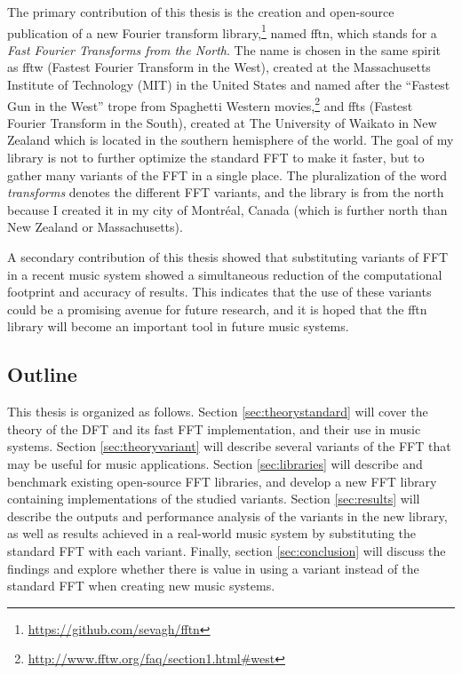 \documentclass[letter,12pt,notitlepage]{article}
\begin{document}
The primary contribution of this thesis is the creation and open-source publication of a new Fourier transform library,\footnote{\href{https://github.com/sevagh/fftn}{https://github.com/sevagh/fftn}} named fftn, which stands for a \textit{Fast Fourier Transforms from the North}. The name is chosen in the same spirit as fftw \cite{fftw} (Fastest Fourier Transform in the West), created at the Massachusetts Institute of Technology (MIT) in the United States and named after the ``Fastest Gun in the West'' trope from Spaghetti Western movies,\footnote{\href{http://www.fftw.org/faq/section1.html\#west}{http://www.fftw.org/faq/section1.html\#west}} and ffts \cite{ffts} (Fastest Fourier Transform in the South), created at The University of Waikato in New Zealand which is located in the southern hemisphere of the world. The goal of my library is not to further optimize the standard FFT to make it faster, but to gather many variants of the FFT in a single place. The pluralization of the word \textit{transforms} denotes the different FFT variants, and the library is from the north because I created it in my city of Montr{\'e}al, Canada (which is further north than New Zealand or Massachusetts).

A secondary contribution of this thesis showed that substituting variants of FFT in a recent music system  showed a simultaneous reduction of the computational footprint and accuracy of results. This indicates that the use of these variants could be a promising avenue for future research, and it is hoped that the fftn library will become an important tool in future music systems.

\subsection{Outline}

This thesis is organized as follows. Section \ref{sec:theorystandard} will cover the theory of the DFT and its fast FFT implementation, and their use in music systems. Section \ref{sec:theoryvariant} will describe several variants of the FFT that may be useful for music applications. Section \ref{sec:libraries} will describe and benchmark existing open-source FFT libraries, and develop a new FFT library containing implementations of the studied variants. Section \ref{sec:results} will describe the outputs and performance analysis of the variants in the new library, as well as results achieved in a real-world music system by substituting the standard FFT with each variant. Finally, section \ref{sec:conclusion} will discuss the findings and explore whether there is value in using a variant instead of the standard FFT when creating new music systems.
\end{document}

